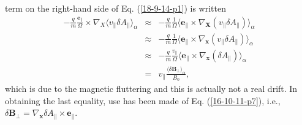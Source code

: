 \documentclass{article}
\begin{document}
term on the right-hand side of Eq. (\ref{18-9-14-p1}) is written
\begin{eqnarray}
  - \frac{q}{m}  \frac{\mathbf{e}_{\parallel}}{\Omega} \times \nabla_X \langle
  v_{\parallel} \delta A_{\parallel} \rangle_{\alpha} & \approx & -
  \frac{q}{m} \frac{1}{\Omega} \langle \mathbf{e}_{\parallel} \times
  \nabla_{\mathbf{X}} (v_{\parallel} \delta A_{\parallel}) \rangle_{\alpha}
  \nonumber\\
  & \approx & - \frac{q}{m}  \frac{1}{\Omega} \langle \mathbf{e}_{\parallel}
  \times \nabla_{\mathbf{x}} (v_{\parallel} \delta A_{\parallel})
  \rangle_{\alpha} \nonumber\\
  & \approx & - \frac{q}{m} \frac{v_{\parallel}}{\Omega} \langle
  \mathbf{e}_{\parallel} \times \nabla_{\mathbf{x}} (\delta A_{\parallel})
  \rangle_{\alpha} \nonumber\\
  & = & v_{\parallel} \frac{\langle \delta \mathbf{B}_{\perp}
  \rangle_{\alpha}}{B_0},  \label{16-10-11-p10}
\end{eqnarray}
which is due to the magnetic fluttering and this is actually not a real drift.
In obtaining the last equality, use has been made of Eq. (\ref{16-10-11-p7}),
i.e., $\delta \mathbf{B}_{\perp} = \nabla_{\mathbf{x}} \delta A_{\parallel}
\times \mathbf{e}_{\parallel}$.
\end{document}
